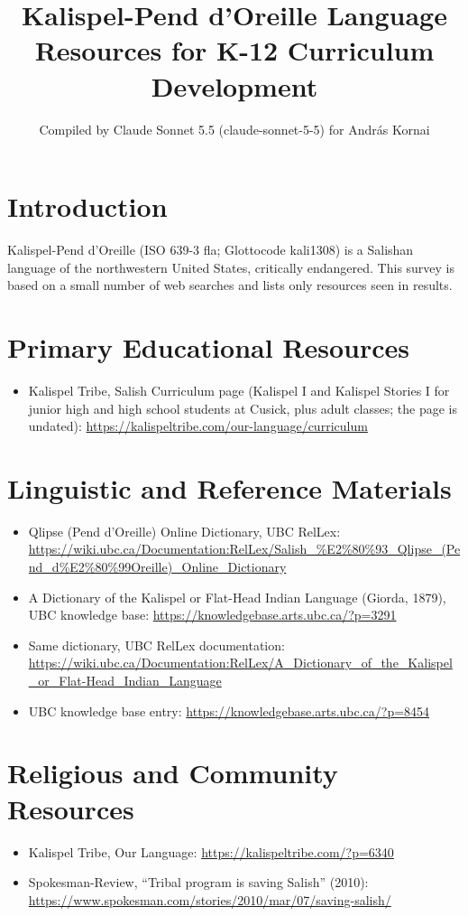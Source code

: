 \documentclass[12pt]{article}
\title{Kalispel-Pend d'Oreille Language Resources for K-12 Curriculum Development}
\author{Compiled by Claude Sonnet 5.5 (claude-sonnet-5-5) for Andr\'as Kornai}
\date{}
\begin{document}
\maketitle

\section{Introduction}
Kalispel-Pend d'Oreille (ISO 639-3 fla; Glottocode kali1308) is a Salishan language of the northwestern United States, critically endangered. This survey is based on a small number of web searches and lists only resources seen in results.

\section{Primary Educational Resources}
\begin{itemize}
\item Kalispel Tribe, Salish Curriculum page (Kalispel I and Kalispel Stories I for junior high and high school students at Cusick, plus adult classes; the page is undated): \url{https://kalispeltribe.com/our-language/curriculum}
\end{itemize}

\section{Linguistic and Reference Materials}
\begin{itemize}
\item Qlipse (Pend d'Oreille) Online Dictionary, UBC RelLex: \url{https://wiki.ubc.ca/Documentation:RelLex/Salish_%E2%80%93_Qlipse_(Pend_d%E2%80%99Oreille)_Online_Dictionary}
\item A Dictionary of the Kalispel or Flat-Head Indian Language (Giorda, 1879), UBC knowledge base: \url{https://knowledgebase.arts.ubc.ca/?p=3291}
\item Same dictionary, UBC RelLex documentation: \url{https://wiki.ubc.ca/Documentation:RelLex/A_Dictionary_of_the_Kalispel_or_Flat-Head_Indian_Language}
\item UBC knowledge base entry: \url{https://knowledgebase.arts.ubc.ca/?p=8454}
\end{itemize}

\section{Religious and Community Resources}
\begin{itemize}
\item Kalispel Tribe, Our Language: \url{https://kalispeltribe.com/?p=6340}
\item Spokesman-Review, ``Tribal program is saving Salish'' (2010): \url{https://www.spokesman.com/stories/2010/mar/07/saving-salish/}
\end{itemize}
\end{document}
